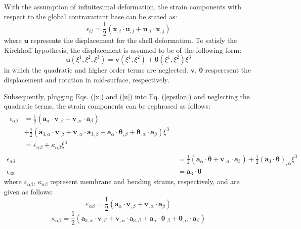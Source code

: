 With the assumption of infinitesimal deformation, the strain components with respect to the global contravariant base can be stated as:
\begin{equation}\label{epsilon}
\epsilon_{ij} = \frac{1}{2}(\boldsymbol x_{,i} \cdot \boldsymbol u_{,j} + \boldsymbol u_{,i} \cdot \boldsymbol x_{,j})
\end{equation}
where $\boldsymbol u$ represents the displacement for the shell deformation. To satisfy the Kirchhoff hypothesis, the displacement is assumed to be of the following form:
\begin{equation}\label{u}
\boldsymbol u(\xi^1,\xi^2,\xi^3) = \boldsymbol v(\xi^1,\xi^2) + \boldsymbol \theta(\xi^1,\xi^2) \xi^3
\end{equation}
in which the quadratic and higher order terms are neglected. $\boldsymbol v$, $\boldsymbol \theta$ resperesent the displacement and rotation in mid-surface, respectively.

Subsequently, plugging Eqs. (\ref{x}) and (\ref{u}) into Eq. (\ref{epsilon}) and neglecting the quadratic terms, the strain components can be rephrased as follows:
\begin{subequations}
\begin{align}
\begin{split}
\epsilon_{\alpha\beta} &= \frac{1}{2}(\boldsymbol a_\alpha \cdot \boldsymbol v_{,\beta} + \boldsymbol v_{,\alpha}\cdot \boldsymbol a_\beta) \\ 
&+ \frac{1}{2}(\boldsymbol a_{3,\alpha} \cdot \boldsymbol v_{,\beta} + \boldsymbol v_{,\alpha}\cdot \boldsymbol a_{3,\beta} + \boldsymbol a_\alpha \cdot \boldsymbol \theta_{,\beta} + \boldsymbol \theta_{,\alpha}\cdot \boldsymbol a_\beta)\xi^3 \\
&= \varepsilon_{\alpha\beta} + \kappa_{\alpha\beta}\xi^3
\end{split} \\
\epsilon_{\alpha 3} &= \frac{1}{2}(\boldsymbol a_\alpha \cdot \boldsymbol \theta + \boldsymbol v_{,\alpha}\cdot \boldsymbol a_3) + \frac{1}{2} (\boldsymbol a_3 \cdot \boldsymbol \theta)_{,\alpha}\xi^3 \\ 
\epsilon_{33} &= \boldsymbol a_3 \cdot \boldsymbol \theta
\end{align}
\end{subequations}
where $\varepsilon_{\alpha\beta}$, $\kappa_{\alpha\beta}$ represent membrane and bending strains, respectively, and are given as follows:
\begin{equation}
\varepsilon_{\alpha\beta} = \frac{1}{2}(\boldsymbol a_\alpha \cdot \boldsymbol v_{,\beta} + \boldsymbol v_{,\alpha}\cdot \boldsymbol a_\beta) 
\end{equation}
\begin{equation}\label{kappa1}
\kappa_{\alpha\beta} = \frac{1}{2}(\boldsymbol a_{3,\alpha} \cdot \boldsymbol v_{,\beta} + \boldsymbol v_{,\alpha}\cdot \boldsymbol a_{3,\beta} + \boldsymbol a_\alpha \cdot \boldsymbol \theta_{,\beta} + \boldsymbol \theta_{,\alpha}\cdot \boldsymbol a_\beta)
\end{equation}


